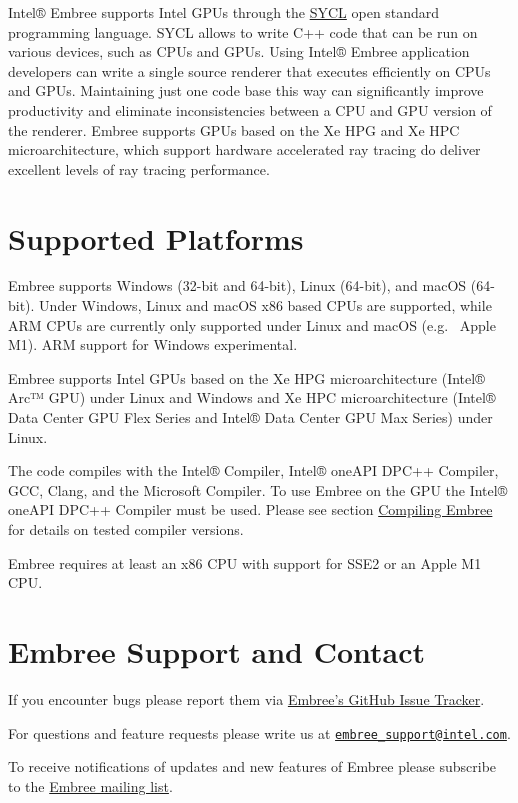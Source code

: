 Intel® Embree supports Intel GPUs through the
\href{https://www.khronos.org/sycl/}{SYCL} open standard programming
language. SYCL allows to write C++ code that can be run on various
devices, such as CPUs and GPUs. Using Intel® Embree application
developers can write a single source renderer that executes efficiently
on CPUs and GPUs. Maintaining just one code base this way can
significantly improve productivity and eliminate inconsistencies between
a CPU and GPU version of the renderer. Embree supports GPUs based on the
Xe HPG and Xe HPC microarchitecture, which support hardware accelerated
ray tracing do deliver excellent levels of ray tracing performance.

\section{Supported Platforms}\label{supported-platforms}

Embree supports Windows (32-bit and 64-bit), Linux (64-bit), and macOS
(64-bit). Under Windows, Linux and macOS x86 based CPUs are supported,
while ARM CPUs are currently only supported under Linux and macOS (e.g.~
Apple M1). ARM support for Windows experimental.

Embree supports Intel GPUs based on the Xe HPG microarchitecture (Intel®
Arc™ GPU) under Linux and Windows and Xe HPC microarchitecture (Intel®
Data Center GPU Flex Series and Intel® Data Center GPU Max Series) under
Linux.

The code compiles with the Intel® Compiler, Intel® oneAPI DPC++
Compiler, GCC, Clang, and the Microsoft Compiler. To use Embree on the
GPU the Intel® oneAPI DPC++ Compiler must be used. Please see section
\hyperref[compiling-embree]{Compiling Embree} for details on tested
compiler versions.

Embree requires at least an x86 CPU with support for SSE2 or an Apple M1
CPU.

\section{Embree Support and Contact}\label{embree-support-and-contact}

If you encounter bugs please report them via
\href{https://github.com/embree/embree/issues}{Embree's GitHub Issue
Tracker}.

For questions and feature requests please write us at
\href{mailto:embree_support@intel.com}{\nolinkurl{embree\_support@intel.com}}.

To receive notifications of updates and new features of Embree please
subscribe to the \href{https://groups.google.com/d/forum/embree/}{Embree
mailing list}.

